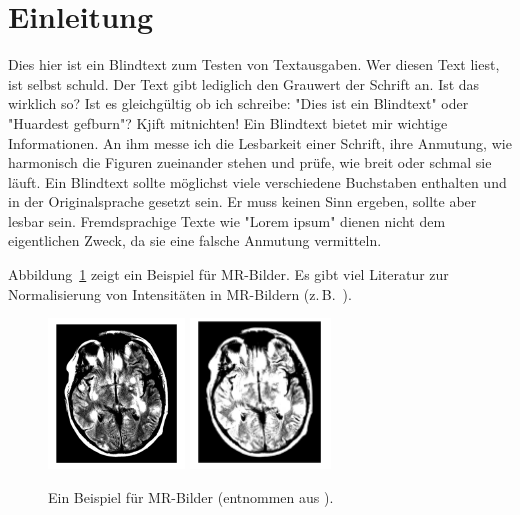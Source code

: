 \section{Einleitung}%
\label{sec:einleitung}

Dies hier ist ein Blindtext zum Testen von Textausgaben.
Wer diesen Text liest, ist selbst schuld.
Der Text gibt lediglich den Grauwert der Schrift an.
Ist das wirklich so?
Ist es gleichgültig ob ich schreibe:
"Dies ist ein Blindtext" oder "Huardest gefburn"? Kjift mitnichten!
Ein Blindtext bietet mir wichtige Informationen. 
An ihm messe ich die Lesbarkeit einer Schrift, ihre Anmutung,
wie harmonisch die Figuren zueinander stehen und prüfe, wie breit oder schmal sie läuft. 
Ein Blindtext sollte möglichst viele verschiedene Buchstaben enthalten
und in der Originalsprache gesetzt sein. Er muss keinen Sinn ergeben, sollte
aber lesbar sein. Fremdsprachige Texte wie "Lorem ipsum" dienen nicht dem
eigentlichen Zweck, da sie eine falsche Anmutung vermitteln.


Abbildung~\ref{fig:mri} zeigt ein Beispiel für MR-Bilder.
Es gibt viel Literatur zur Normalisierung von Intensitäten in MR-Bildern (z.\,B.~\cite{Jaeger09}). 


\begin{figure}[h]
\centering
\includegraphics[height=4cm]{Grafiken/jaeger1.png}
\includegraphics[height=4cm]{Grafiken/jaeger2.png}
\caption{Ein Beispiel für MR-Bilder (entnommen aus \cite{Jaeger09}).}%
\label{fig:mri}
\end{figure}
